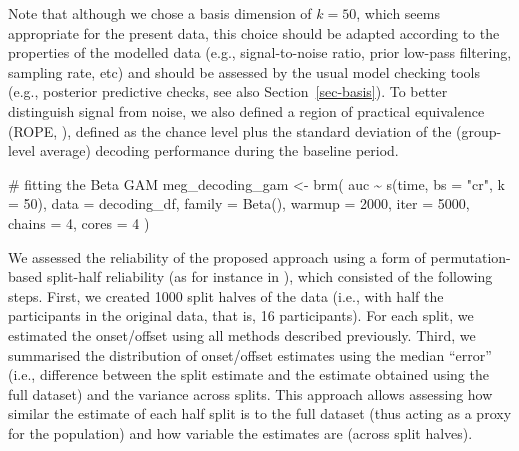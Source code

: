 \documentclass[
  doc,
  floatsintext,
  longtable,
  a4paper,
  nolmodern,
  notxfonts,
  notimes,
  colorlinks=true,linkcolor=blue,citecolor=blue,urlcolor=blue]{apa7}
\newenvironment{Shaded}{\begin{snugshade}}{\end{snugshade}}
\newcommand{\AttributeTok}[1]{\textcolor[rgb]{0.40,0.45,0.13}{#1}}
\newcommand{\CommentTok}[1]{\textcolor[rgb]{0.37,0.37,0.37}{#1}}
\newcommand{\DecValTok}[1]{\textcolor[rgb]{0.68,0.00,0.00}{#1}}
\newcommand{\FunctionTok}[1]{\textcolor[rgb]{0.28,0.35,0.67}{#1}}
\newcommand{\NormalTok}[1]{\textcolor[rgb]{0.00,0.23,0.31}{#1}}
\newcommand{\OtherTok}[1]{\textcolor[rgb]{0.00,0.23,0.31}{#1}}
\newcommand{\SpecialCharTok}[1]{\textcolor[rgb]{0.37,0.37,0.37}{#1}}
\newcommand{\StringTok}[1]{\textcolor[rgb]{0.13,0.47,0.30}{#1}}
\begin{document}
Note that although we chose a basis dimension of \(k=50\), which seems
appropriate for the present data, this choice should be adapted
according to the properties of the modelled data (e.g., signal-to-noise
ratio, prior low-pass filtering, sampling rate, etc) and should be
assessed by the usual model checking tools (e.g., posterior predictive
checks, see also Section~\ref{sec-basis}). To better distinguish signal
from noise, we also defined a region of practical equivalence (ROPE,
), defined as the
chance level plus the standard deviation of the (group-level average)
decoding performance during the baseline period.

\begin{Shaded}
\begin{Highlighting}[]
\CommentTok{\# fitting the Beta GAM}
\NormalTok{meg\_decoding\_gam }\OtherTok{\textless{}{-}} \FunctionTok{brm}\NormalTok{(}
\NormalTok{    auc }\SpecialCharTok{\textasciitilde{}} \FunctionTok{s}\NormalTok{(time, }\AttributeTok{bs =} \StringTok{"cr"}\NormalTok{, }\AttributeTok{k =} \DecValTok{50}\NormalTok{),}
    \AttributeTok{data =}\NormalTok{ decoding\_df,}
    \AttributeTok{family =} \FunctionTok{Beta}\NormalTok{(),}
    \AttributeTok{warmup =} \DecValTok{2000}\NormalTok{,}
    \AttributeTok{iter =} \DecValTok{5000}\NormalTok{,}
    \AttributeTok{chains =} \DecValTok{4}\NormalTok{,}
    \AttributeTok{cores =} \DecValTok{4}
\NormalTok{    )}
\end{Highlighting}
\end{Shaded}

We assessed the reliability of the proposed approach using a form of
permutation-based split-half reliability (as for instance in
), which consisted
of the following steps. First, we created 1000 split halves of the data
(i.e., with half the participants in the original data, that is, 16
participants). For each split, we estimated the onset/offset using all
methods described previously. Third, we summarised the distribution of
onset/offset estimates using the median ``error'' (i.e., difference
between the split estimate and the estimate obtained using the full
dataset) and the variance across splits. This approach allows assessing
how similar the estimate of each half split is to the full dataset (thus
acting as a proxy for the population) and how variable the estimates are
(across split halves).
\end{document}
